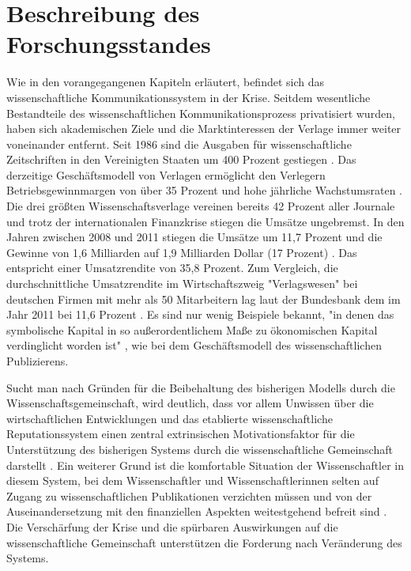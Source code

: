 \section{Beschreibung des Forschungsstandes}
Wie in den vorangegangenen Kapiteln erläutert, befindet sich das wissenschaftliche Kommunikationssystem in der Krise. Seitdem wesentliche Bestandteile des wissenschaftlichen Kommunikationsprozess privatisiert wurden, haben sich akademischen Ziele und die Marktinteressen der Verlage immer weiter voneinander entfernt. Seit 1986 sind die Ausgaben für wissenschaftliche Zeitschriften in den Vereinigten Staaten um 400 Prozent gestiegen \cite{suchen_ARL_Statistics_2010-11 Momograph_Serial_Costs_in_Libraries}. Das derzeitige Geschäftsmodell von Verlagen ermöglicht den Verlegern Betriebsgewinnmargen von über 35 Prozent \cite{russell_2008_business} \cite{cope2014future} und hohe jährliche Wachstumsraten \cite{Wellcome_Trust_2003}. Die drei größten Wissenschaftsverlage vereinen bereits 42 Prozent aller Journale und trotz der internationalen Finanzkrise stiegen die Umsätze ungebremst. In den Jahren zwischen 2008 und 2011 stiegen die Umsätze um 11,7 Prozent und die Gewinne von 1,6 Milliarden auf 1,9 Milliarden Dollar (17 Prozent) \cite{cope2014future}. Das entspricht einer Umsatzrendite von 35,8 Prozent. Zum Vergleich, die durchschnittliche Umsatzrendite im Wirtschaftszweig "Verlagswesen" bei deutschen Firmen mit mehr als 50 Mitarbeitern lag laut der Bundesbank dem im Jahr 2011 bei 11,6 Prozent \cite{bundesbank_2014}. Es sind nur wenig Beispiele bekannt, "in denen das symbolische Kapital in so außerordentlichem Maße zu ökonomischen Kapital verdinglicht worden ist" \cite{hagner_2015_sache_buches}, wie bei dem Geschäftsmodell des wissenschaftlichen Publizierens.

Sucht man nach Gründen für die Beibehaltung des bisherigen Modells durch die Wissenschaftsgemeinschaft, wird deutlich, dass vor allem Unwissen über die wirtschaftlichen Entwicklungen und das etablierte wissenschaftliche Reputationssystem einen zentral extrinsischen Motivationsfaktor für die Unterstützung des bisherigen Systems durch die wissenschaftliche Gemeinschaft darstellt \cite{minssen_2012_arbeit}. Ein weiterer Grund ist die komfortable Situation der Wissenschaftler in diesem System, bei dem Wissenschaftler und Wissenschaftlerinnen selten auf Zugang zu wissenschaftlichen Publikationen verzichten müssen und von der Auseinandersetzung mit den finanziellen Aspekten weitestgehend befreit sind \cite{herb_2010} \cite{hanekop_2006}. Die Verschärfung der Krise und die spürbaren Auswirkungen auf die wissenschaftliche Gemeinschaft unterstützen die Forderung nach Veränderung des Systems.

